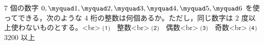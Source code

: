 $7$ 個の数字 $0,\myquad 1,\myquad 2,\myquad 3,\myquad 4,\myquad 5,\myquad 6$ 
を使ってできる，次のような $4$ 桁の整数は何個あるか。ただし，同じ数字は $2$ 度以上使わないものとする。<br>
⑴　整数<br>
⑵　偶数<br>
⑶　奇数<br>
⑷　$3200$ 以上